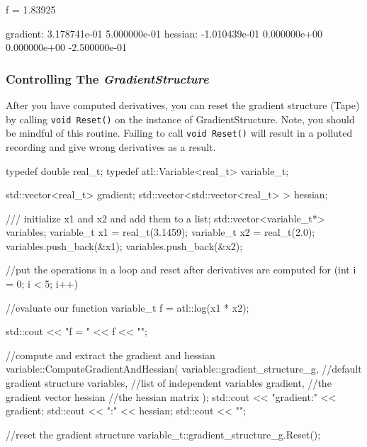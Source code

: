 \documentclass[12pt,a4paper]{article}
\newcommand{\Code}[1]{%
\lstinline{#1}}
\begin{document}
\begin{myoutput}
f = 1.83925

gradient:
3.178741e-01   5.000000e-01
hessian:
-1.010439e-01   0.000000e+00
0.000000e+00   -2.500000e-01

\end{myoutput}

\subsubsection{Controlling The \textit{GradientStructure}}
After you have computed derivatives, you can reset the gradient structure (Tape) by calling \Code{void Reset()} on the instance of GradientStructure. Note, you should be mindful of this routine. Failing to call \Code{void Reset()}  will result in a polluted recording and give wrong derivatives as a result.

\begin{cppsource}
    typedef double real_t;
    typedef atl::Variable<real_t> variable_t;
   
    std::vector<real_t> gradient;
    std::vector<std::vector<real_t> > hessian;

    /// initialize x1 and x2 and add them to a list;
    std::vector<variable_t*> variables;
    variable_t x1 = real_t(3.1459);
    variable_t x2 = real_t(2.0);
    variables.push_back(&x1);
    variables.push_back(&x2);

    //put the operations in a loop and reset after derivatives are computed
    for (int i = 0; i < 5; i++) {

        //evaluate our function
        variable_t f = atl::log(x1 * x2);

        std::cout << "f = " << f << "\n\n";

        //compute and extract the gradient and hessian
       variable::ComputeGradientAndHessian(
       variable::gradient_structure_g, //default gradient structure 
        variables,                    //list of independent variables
         gradient,                    //the gradient vector
         hessian                      //the hessian matrix
         );
        std::cout << "gradient:\n" << gradient;
        std::cout << "\n\nHessian:\n" << hessian;
        std::cout << "\n\n";
        
        //reset the gradient structure
        variable_t::gradient_structure_g.Reset();

    }
\end{cppsource}
\end{document}
